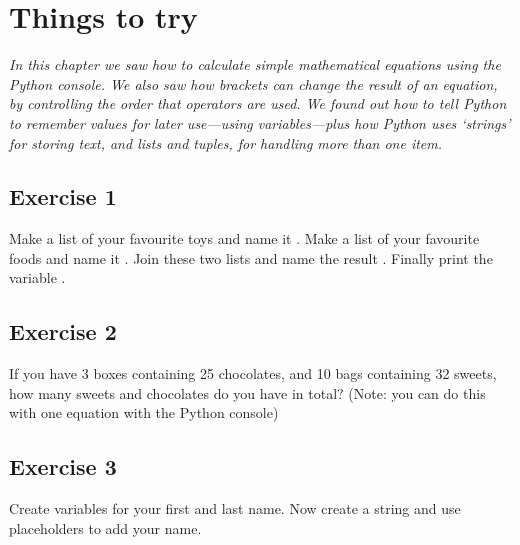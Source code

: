 \section{Things to try}

\emph{In this chapter we saw how to calculate simple mathematical equations using the Python console.  We also saw how brackets can change the result of an equation, by controlling the order that operators are used.  We found out how to tell Python to remember values for later use---using variables---plus how Python uses `strings' for storing text, and lists and tuples, for handling more than one item.}
\par

\subsection*{Exercise 1}
Make a list of your favourite toys and name it .  Make a list of your favourite foods and name it .  Join these two lists and name the result .  Finally print the variable .

\subsection*{Exercise 2}
If you have 3 boxes containing 25 chocolates, and 10 bags containing 32 sweets, how many sweets and chocolates do you have in total?  (Note: you can do this with one equation with the Python console)

\subsection*{Exercise 3}
Create variables for your first and last name. Now create a string and use placeholders to add your name.


\newpage